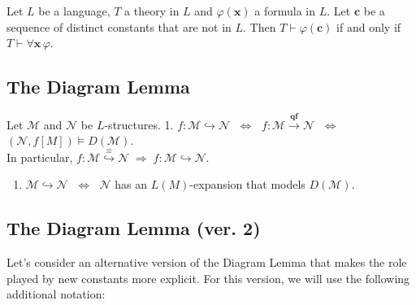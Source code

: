 \documentclass[a4paper,UKenglish,cleveref,autoref,thm-restate,12pt]{lipics-v2021-wjd}
\newcommand{\<}{\langle}
\renewcommand{\>}{\rangle}
\begin{document}
\begin{lemma} Let \(L\) be a language, \(T\) a
theory in \(L\) and \(\varphi(\mathbf x)\) a formula in \(L\). Let
\(\mathbf c\) be a sequence of distinct constants that are not in \(L\).
Then \(T \vdash \varphi(\mathbf c)\) if and only if
\(T \vdash \forall \mathbf x\, \varphi\).
\end{lemma}

\subsection{The Diagram Lemma}\label{the-diagram-lemma}

\begin{lemma} Let \(\mathcal M\) and
\(\mathcal N\) be \(L\)-structures. 1.
\(f \colon \mathcal M \hookrightarrow \mathcal N\)
\(\; \Leftrightarrow \;\)
\(f \colon \mathcal M \stackrel{\mathbf{qf}}{\longrightarrow} \mathcal N\)
\(\; \Leftrightarrow \;\) \((\mathcal N, f[M]) \vDash D(\mathcal M)\).\\
In particular,
\(f \colon \mathcal M \stackrel{\equiv}{\hookrightarrow} \mathcal N \; \Rightarrow \; f \colon \mathcal M \hookrightarrow \mathcal N\).

\begin{enumerate}
\def\labelenumi{\arabic{enumi}.}
\setcounter{enumi}{1}
\item
  \(\mathcal M \hookrightarrow \mathcal N\) \(\; \Leftrightarrow \;\)
  \(\mathcal N\) has an \(L(M)\)-expansion that models
  \(D(\mathcal M)\).
\end{enumerate}
\end{lemma}

\subsection{The Diagram Lemma (ver.
2)}\label{the-diagram-lemma-ver.-2}

Let's consider an alternative version of the Diagram Lemma that makes
the role played by new constants more explicit. For this version, we
will use the following additional notation:
\end{document}
